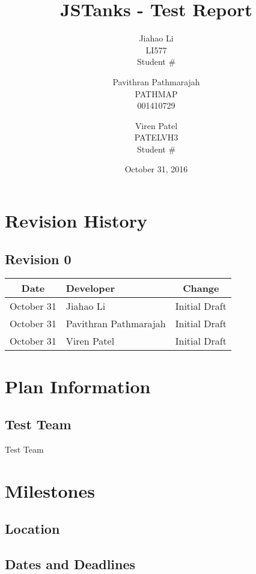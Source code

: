 \documentclass{article}
\begin{document}
\newpage
\title{JSTanks - Test Report}
\date{October 31, 2016}
\author{Jiahao Li\\LI577\\Student \# \and Pavithran Pathmarajah\\PATHMAP\\001410729 \and Viren Patel\\PATELVH3\\Student \#}

\maketitle

\newpage
{}
\tableofcontents
\newpage
\section{Revision History}
\subsection{Revision 0}
\begin{table}[h!]
	\begin{tabular}{clc}
		\toprule
		Date & Developer & Change\\
		\midrule
		October 31&Jiahao Li &Initial Draft \\
		October 31&Pavithran Pathmarajah &Initial Draft\\
		October 31&Viren Patel  &Initial Draft\\
	\end{tabular}
\end{table}


\section{Plan Information}
\subsection{Test Team}
Test Team
\section{Milestones}
\subsection{Location}
\subsection{Dates and Deadlines}
\end{document}
